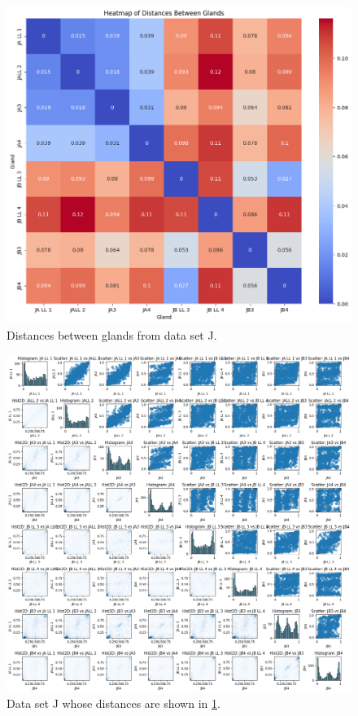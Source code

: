 \begin{figure}[h]
    \centering
    \includegraphics[width=\textwidth]{Chapter_methylation/figures/data_example_distances.png}
    \caption{Distances between glands from data set J.}
    \label{fig:data_distances}
\end{figure}
\begin{figure}[h]
    \centering
    \includegraphics[width=\textwidth]{Chapter_methylation/figures/data_example_corrs.png}
    \caption{Data set J whose distances are shown in \ref{fig:data_distances}.}
    \label{fig:data_example_corrs}
\end{figure}
\clearpage
